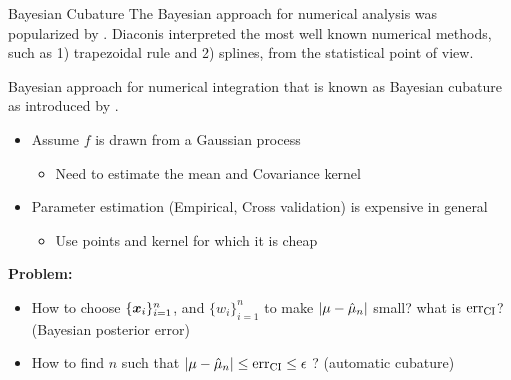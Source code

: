 \documentclass[handout, 10pt,compress,xcolor={usenames,dvipsnames}]{beamer} %
\newcommand{\CI}{\textup{CI}}
\newcommand{\err}{{\text{err}}}
\newcommand{\errtol}{{\epsilon}}
\def\abs#1{\ensuremath{\left \lvert #1 \right \rvert}}
\begin{document}
\begin{frame}{Bayesian Cubature}
	\vspace*{-4ex}
	The Bayesian approach for numerical analysis was popularized by . 
	Diaconis interpreted the most well known numerical methods, such as 1) trapezoidal rule and 2) splines, from the statistical point of view.
	
	Bayesian approach for numerical integration that is known as Bayesian cubature as introduced by .
	
	
	
	\begin{itemize}
		\item Assume \alert{$f$} is drawn from a Gaussian process 
		\begin{itemize}
			\item Need to estimate the mean and Covariance kernel
		\end{itemize}
		\item Parameter estimation (Empirical, Cross validation) is expensive in general
		\begin{itemize}
			\item Use points and kernel for which it is cheap
		\end{itemize}
	\end{itemize}

	{
	\textbf{Problem:}
	\vspace*{-4ex}
	\begin{itemize}
		\item How to choose \alert{$\{\boldsymbol{x}_i\}_{i=1}^n$}, and
		\alert{$\{w_i\}_{i=1}^n$} to make $\abs{\mu - \hmu_n}$ small? what is $\err_\CI$? \alert{(Bayesian posterior error)}
		\item How to find $n$ such that $\abs{\mu - \hmu_n} \le \err_\CI \le \errtol $ ? \alert{(automatic cubature)}
	\end{itemize}
}
\end{frame}
\end{document}
